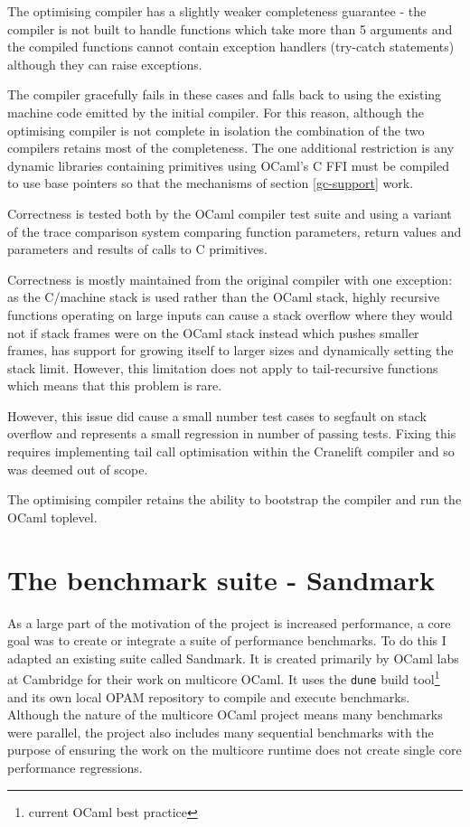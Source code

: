 The optimising compiler has a slightly weaker completeness guarantee - the compiler is not built to
handle functions which take more than 5 arguments and the compiled functions cannot contain
exception handlers (try-catch statements) although they can raise exceptions.

The compiler gracefully fails in these cases and falls back to using the existing machine code
emitted by the initial compiler. For this reason, although the optimising compiler is not complete
in isolation the combination of the two compilers retains most of the completeness. The one
additional restriction is any dynamic libraries containing primitives using OCaml's C FFI must be
compiled to use base pointers so that the mechanisms of section \ref{gc-support} work.

Correctness is tested both by the OCaml compiler test suite and using a variant of the trace
comparison system comparing function parameters, return values and parameters and results of calls
to C primitives.

Correctness is mostly maintained from the original compiler with one exception: as the C/machine
stack is used rather than the OCaml stack, highly recursive functions operating on large inputs can
cause a stack overflow where they would not if stack frames were on the OCaml stack instead which
pushes smaller frames, has support for growing itself to larger sizes and dynamically setting the
stack limit.  However, this limitation does not apply to tail-recursive functions which means that
this problem is rare.

However, this issue did cause a small number test cases to segfault on stack overflow and
represents a small regression in number of passing tests. Fixing this requires implementing tail
call optimisation within the Cranelift compiler and so was deemed out of scope.

The optimising compiler retains the ability to bootstrap the compiler and run the OCaml toplevel.

\section{The benchmark suite - Sandmark}

As a large part of the motivation of the project is increased performance, a core goal was to
create or integrate a suite of performance benchmarks. To do this I adapted an existing suite
called Sandmark. It is created primarily by OCaml labs at Cambridge for their work on
multicore OCaml. It uses the \texttt{dune} build tool\footnote{current OCaml best practice} and its
own local OPAM repository to compile and execute benchmarks. Although the nature of the multicore
OCaml project means many benchmarks were parallel, the project also includes many sequential
benchmarks with the purpose of ensuring the work on the multicore runtime does not create single
core performance regressions.

